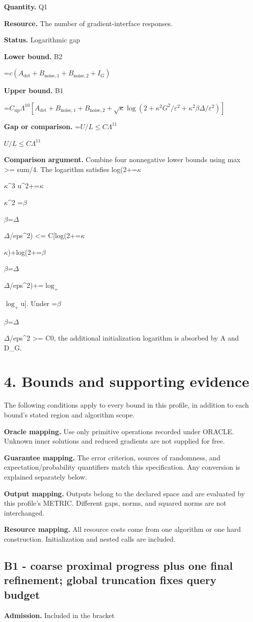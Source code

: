 \documentclass[10pt,a4paper]{article}
\newcommand{\AtlasMath}[1]{\par\begingroup\centering\setbox0=\hbox{$\displaystyle #1$}\ifdim\wd0>1.4\linewidth\typeout{ATLAS WIDE FORMULA: \the\wd0}\fi\ifdim\wd0>\linewidth\resizebox{\linewidth}{!}{\box0}\else\box0\fi\par\endgroup}
\newcommand{\AtlasInlineMath}[1]{\begingroup\setbox0=\hbox{$#1$}\ifdim\wd0>.4\linewidth\endgroup\AtlasMath{#1}\else\endgroup$#1$\fi}
\begin{document}
\textbf{Quantity.} Q1

\textbf{Resource.} The number of gradient-interface responses.

\textbf{Status.} Logarithmic gap

\textbf{Lower bound.} B2

\AtlasMath{c(A_{\mathrm{det}}+B_{\mathrm{noise},1}+B_{\mathrm{noise},2}+I_G)}
\textbf{Upper bound.} B1

\AtlasMath{C_{\mathrm{up}}\Lambda^{10}[A_{\mathrm{det}}+B_{\mathrm{noise},1}+B_{\mathrm{noise},2}+\sqrt\kappa\log(2+\kappa^2G^2/\varepsilon^2+\kappa^2\beta\Delta/\varepsilon^2)]}
\textbf{Gap or comparison.} \AtlasInlineMath{U/L\le C\Lambda^{11}}

\textbf{Comparison argument.} Combine four nonnegative lower bounds using max >= sum/4. The logarithm satisfies log(2+\AtlasInlineMath{\kappa}\textasciicircum{}3 u\textasciicircum{}2+\AtlasInlineMath{\kappa}\textasciicircum{}2 \AtlasInlineMath{\beta}\AtlasInlineMath{\Delta}/eps\textasciicircum{}2) <= C[log(2+\AtlasInlineMath{\kappa})+log(2+\AtlasInlineMath{\beta}\AtlasInlineMath{\Delta}/eps\textasciicircum{}2)+\AtlasInlineMath{\log_+}u]. Under \AtlasInlineMath{\beta}\AtlasInlineMath{\Delta}/eps\textasciicircum{}2 >= C0, the additional initialization logarithm is absorbed by A and D\_G.

\section{4. Bounds and supporting evidence}
The following conditions apply to every bound in this profile, in addition to each bound's stated region and algorithm scope.

\textbf{Oracle mapping.} Use only primitive operations recorded under ORACLE. Unknown inner solutions and reduced gradients are not supplied for free.

\textbf{Guarantee mapping.} The error criterion, sources of randomness, and expectation/probability quantifiers match this specification. Any conversion is explained separately below.

\textbf{Output mapping.} Outputs belong to the declared space and are evaluated by this profile's METRIC. Different gaps, norms, and squared norms are not interchanged.

\textbf{Resource mapping.} All resource costs come from one algorithm or one hard construction. Initialization and nested calls are included.

\subsection{B1 - coarse proximal progress plus one final refinement; global truncation fixes query budget}
\textbf{Admission.} Included in the bracket
\end{document}
